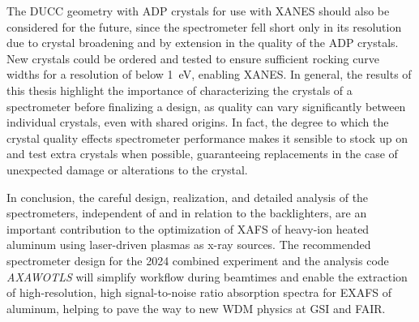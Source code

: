 The DUCC geometry with ADP crystals for use with XANES should also be considered for the future, since the spectrometer fell short only in its resolution due to crystal broadening and by extension in the quality of the ADP crystals. New crystals could be ordered and tested to ensure sufficient rocking curve widths for a resolution of below \SI{1}{\electronvolt}, enabling XANES. In general, the results of this thesis highlight the importance of characterizing the crystals of a spectrometer before finalizing a design, as quality can vary significantly between individual crystals, even with shared origins. In fact, the degree to which the crystal quality effects spectrometer performance makes it sensible to stock up on and test extra crystals when possible, guaranteeing replacements in the case of unexpected damage or alterations to the crystal.

In conclusion, the careful design, realization, and detailed analysis of the spectrometers, independent 
of and in relation to the backlighters, are an important contribution to the optimization of XAFS of 
heavy-ion heated aluminum using laser-driven plasmas as x-ray sources. The recommended spectrometer design for the 2024 combined experiment and the analysis code \textit{AXAWOTLS} will simplify workflow during beamtimes and enable the extraction of high-resolution, high signal-to-noise ratio absorption spectra for EXAFS of aluminum, helping to pave the way to new WDM physics at GSI and FAIR.
